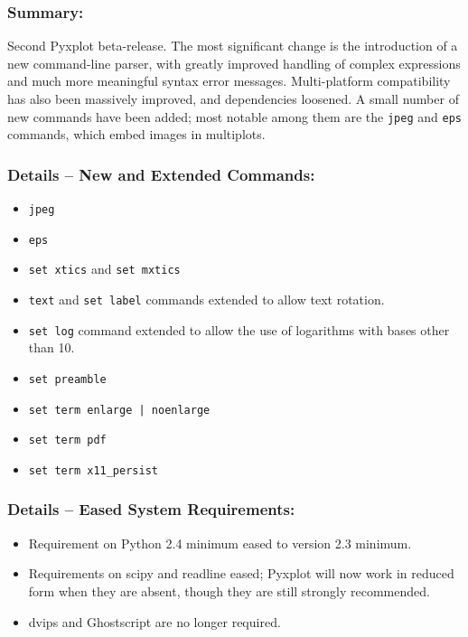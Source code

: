 \subsubsection*{Summary:}

Second Pyxplot beta-release. The most significant change is the introduction of
a new command-line parser, with greatly improved handling of complex
expressions and much more meaningful syntax error messages. Multi-platform
compatibility has also been massively improved, and dependencies loosened.  A
small number of new commands have been added; most notable among them are the
{\tt jpeg} and {\tt eps} commands, which embed images in multiplots.

\subsubsection*{Details -- New and Extended Commands:}

\begin{itemize}
\item {\tt jpeg}
\item {\tt eps}
\item {\tt set xtics} and {\tt set mxtics}
\item {\tt text} and {\tt set label} commands extended to allow text rotation.
\item {\tt set log} command extended to allow the use of logarithms with bases other than 10.
\item {\tt set preamble}
\item {\tt set term enlarge | noenlarge}
\item {\tt set term pdf}
\item {\tt set term x11\_persist}
\end{itemize}

\subsubsection*{Details -- Eased System Requirements:}

\begin{itemize}
\item Requirement on Python 2.4 minimum eased to version 2.3 minimum.
\item Requirements on scipy and readline eased; Pyxplot will now work in reduced form when they are absent, though they are still strongly recommended.
\item dvips and Ghostscript are no longer required.
\end{itemize}

